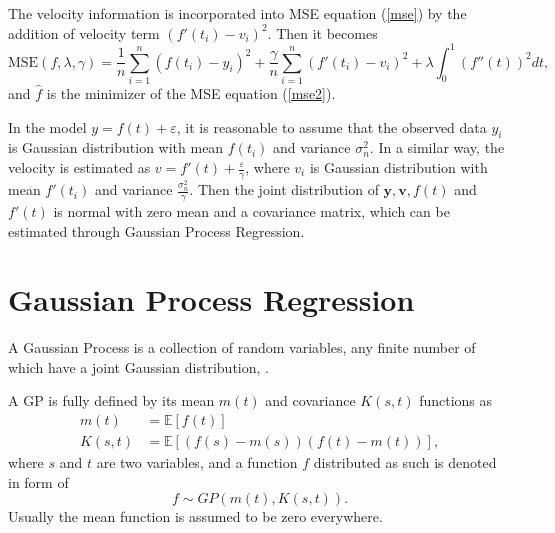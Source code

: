 The velocity information  is incorporated into MSE  equation (\ref{mse}) by the addition of velocity term $(f'(t_i)-v_i)^2$. Then it becomes 
\begin{equation}\label{mse2}
\text{MSE}(f,\lambda,\gamma)=\frac{1}{n}\sum_{i=1}^n(f(t_i)-y_i)^2+\frac{\gamma}{n} \sum_{i=1}^n(f'(t_i)-v_i)^2+\lambda \int_{0}^{1}(f''(t))^2dt,
\end{equation}
and $\hat{f}$ is the minimizer of the MSE equation (\ref{mse2}).

In the model $y=f(t)+\varepsilon$, it is reasonable to assume that the observed data $y_i$ is Gaussian distribution with mean $f(t_i)$ and variance $\sigma_n^2$. In a similar way, the velocity is estimated as  $v=f'(t)+\frac{\varepsilon}{\gamma}$, where $v_i$ is Gaussian distribution with mean $f'(t_i)$ and variance $\frac{\sigma_n^2}{\gamma}$. Then the joint distribution of $\mathbf{y},\mathbf{v},f(t)$ and $f'(t)$ is normal with zero mean and a covariance matrix, which can be estimated through Gaussian Process Regression.

\section{Gaussian Process Regression}

A Gaussian Process is a collection of random variables, any finite number of which have a joint Gaussian distribution, \cite{b_gpml}.

A GP is fully defined by its mean $m(t)$ and covariance $K(s,t)$ functions as
\begin{align}
m(t)&=\mathbb{E}[f(t)] \\
K(s,t)&=\mathbb{E}[(f(s)-m(s)) (f(t)-m(t))],
\end{align}
where $s$ and $t$ are two variables, and a function $f$ distributed as such is denoted in form of
\begin{equation}
f \sim GP(m(t),K(s,t)).
\end{equation}
Usually the mean function is assumed to be zero everywhere. 

